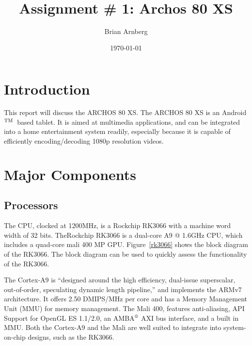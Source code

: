 \documentclass{article}
\title{Assignment \# 1: Archos 80 XS}
\date{ \today }
\author{Brian Arnberg}
\def\tm{\leavevmode\hbox{$\rm {}^{TM}$}}
\begin{document}
\label{start}

\begin{titlepage}
	\maketitle
	\thispagestyle{empty}
\end{titlepage}

\section*{ Introduction }
This report will discuss the ARCHOS 80 XS. 
The ARCHOS 80 XS is an Android\tm\   based tablet. It is aimed at multimedia applications, and can be integrated into a home entertainment system readily, especially because it is capable of efficiently encoding/decoding 1080p resolution videos.\cite{Main} 

\section*{ Major Components }

\subsection*{ Processors }
The CPU, clocked at 1200MHz, is a Rockchip RK3066 with a machine word width of 32 bits.\cite{Second} TheRockchip RK3066 is a dual\--core A9 @ 1.6GHz CPU, which includes a quad\--core mali 400 MP GPU.\cite{rk30xx} Figure~\ref{rk3066} shows the block diagram of the RK3066. The block diagram can be used to quickly assess the functionality of the RK3066.

The Cortex\--A9 is ``designed around the high efficiency, dual\--issue superscalar, out\--of\--order, speculating dynamic length pipeline,'' and implements the ARMv7 architecture.\cite{A9} It offers 2.50 DMIPS/MHz per core and has a Memory Management Unit (MMU) for memory management. The Mali 400, features anti\--aliasing,  API Support for OpenGL ES 1.1/2.0, an AMBA$\textsuperscript{\textregistered}$ AXI bus interface, and a built in MMU.\cite{Mali-400} Both the Cortex\--A9 and the Mali are well suited to integrate into system\--on\--chip designs, such as the RK3066. 
\end{document}
